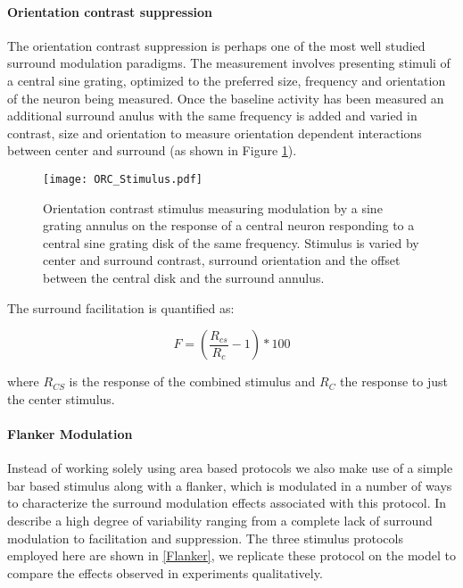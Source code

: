 \paragraph{Orientation contrast suppression}

The orientation contrast suppression is perhaps one of the most well
studied surround modulation paradigms. The measurement involves
presenting stimuli of a central sine grating, optimized to the
preferred size, frequency and orientation of the neuron being
measured. Once the baseline activity has been measured an additional
surround anulus with the same frequency is added and varied in
contrast, size and orientation to measure orientation dependent
interactions between center and surround (as shown in Figure
\ref{ORC_Stimulus}).

\begin{figure}
	\centering
        \texttt{[image: ORC\_Stimulus.pdf]}
	\caption{Orientation contrast stimulus measuring modulation by a
      sine grating annulus on the response of a central neuron
      responding to a central sine grating disk of the same frequency.
      Stimulus is varied by center and surround contrast, surround
      orientation and the offset between the central disk and the
      surround annulus.}
	\label{ORC_Stimulus}
\end{figure}

The surround facilitation is quantified as:

\begin{equation}
F = (\frac{R_{cs}}{R_c} - 1) * 100
\end{equation}

where $R_{CS}$ is the response of the combined stimulus and $R_C$ the
response to just the center stimulus.

\paragraph{Flanker Modulation}

Instead of working solely using area based protocols we also make use
of a simple bar based stimulus along with a flanker, which is
modulated in a number of ways to characterize the surround modulation
effects associated with this protocol. In \cite{Kapadia1995} describe
a high degree of variability ranging from a complete lack of surround
modulation to facilitation and suppression. The three stimulus
protocols employed here are shown in \ref{Flanker}, we replicate these
protocol on the model to compare the effects observed in experiments
qualitatively.

